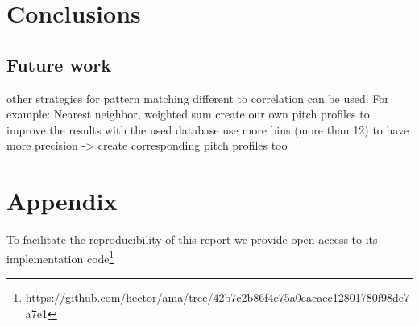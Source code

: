 \documentclass{article}
\begin{document}
\section{Conclusions} %

%
%
%

\subsection{Future work}
other strategies for pattern matching different to correlation can be used. For example: Nearest neighbor, weighted sum
create our own pitch profiles to improve the results with the used database
use more bins (more than 12) to have more precision -> create corresponding pitch profiles too

\section{Appendix}

To facilitate the reproducibility of this report we provide open access to its implementation code\footnote{https://github.com/hector/ama/tree/42b7c2b86f4e75a0eacaec12801780f98de7a7e1} %
\end{document}
